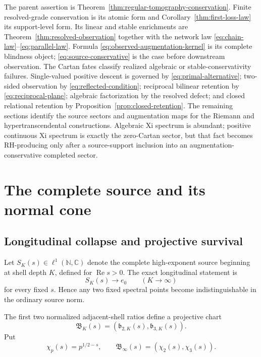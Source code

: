 \documentclass[11pt]{article}
\theoremstyle{definition}
\theoremstyle{remark}
\newcommand{\C}{\mathbb C}
\newcommand{\N}{\mathbb N}
\newcommand{\Rea}{\operatorname{Re}}
\begin{document}
The parent assertion is
Theorem~\ref{thm:regular-tomography-conservation}.  Finite
resolved-grade conservation is its atomic form and
Corollary~\ref{thm:first-loss-law} its support-level form.  Its linear and
stable enrichments are Theorem~\ref{thm:resolved-observation} together with
the network law \eqref{eq:chain-law}--\eqref{eq:parallel-law}.  Formula
\eqref{eq:observed-augmentation-kernel} is its complete blindness object;
\eqref{eq:source-conservative} is the case before downstream observation.
The Cartan fates
classify realized algebraic or stable-conservativity failures.  Single-valued positive descent is governed by
\eqref{eq:primal-alternative}; two-sided observation by
\eqref{eq:reflected-condition}; reciprocal bilinear retention by
\eqref{eq:reciprocal-plane}; algebraic factorization by the resolved defect;
and closed relational retention by Proposition~\ref{prop:closed-retention}.
The remaining sections identify the source sectors and augmentation maps
for the Riemann and hypertranscendental constructions.  Algebraic Xi
spectrum is abundant; positive continuous Xi spectrum is exactly the
zero-Cartan sector, but that fact becomes RH-producing only after a
source-support inclusion into an augmentation-conservative completed
sector.

\section{The complete source and its normal cone}

\subsection{Longitudinal collapse and projective survival}

Let \(S_K(s)\in\ell^1(\N,\C)\) denote the complete high-exponent source
beginning at shell depth \(K\), defined for \(\Rea s>0\).  The exact
longitudinal statement is
\[
                     S_K(s)\longrightarrow e_0
                     \qquad(K\to\infty)
\tag{3.1}\label{eq:source-collapse}
\]
for every fixed \(s\).  Hence any two fixed spectral points become
indistinguishable in the ordinary source norm.

The first two normalized adjacent-shell ratios define a projective chart
\[
 \mathfrak B_K(s)=
 \left(\mathfrak b_{2,K}(s),\mathfrak b_{3,K}(s)\right).
\tag{3.2}\label{eq:blowup-chart}
\]
Put
\[
 \chi_p(s)=p^{1/2-s},\qquad
 \mathfrak B_\infty(s)=\left(\chi_2(s),\chi_3(s)\right).
\tag{3.3}\label{eq:two-prime}
\]
\end{document}
